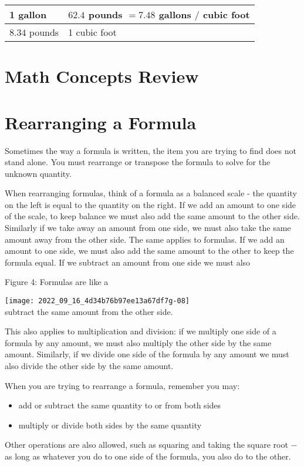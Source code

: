 \begin{enumerate}
\begin{tabular}{l|l}
1 gallon & $62.4$ pounds $=7.48$ gallons $/$ cubic foot \\
\hline
$8.34$ pounds & 1 cubic foot \\
\hline
\end{tabular}

\section{Math Concepts Review}
\section{Rearranging a Formula}
Sometimes the way a formula is written, the item you are trying to find does not stand alone. You must rearrange or transpose the formula to solve for the unknown quantity.

When rearranging formulas, think of a formula as a balanced scale - the quantity on the left is equal to the quantity on the right. If we add an amount to one side of the scale, to keep balance we must also add the same amount to the other side. Similarly if we take away an amount from one side, we must also take the same amount away from the other side. The same applies to formulas. If we add an amount to one side, we must also add the same amount to the other to keep the formula equal. If we subtract an amount from one side we must also

Figure 4: Formulas are like a

\texttt{[image: 2022\_09\_16\_4d34b76b97ee13a67df7g-08]}\\
subtract the same amount from the other side.

This also applies to multiplication and division: if we multiply one side of a formula by any amount, we must also multiply the other side by the same amount. Similarly, if we divide one side of the formula by any amount we must also divide the other side by the same amount.

When you are trying to rearrange a formula, remember you may:

\begin{itemize}
  \item add or subtract the same quantity to or from both sides

  \item multiply or divide both sides by the same quantity

\end{itemize}
Other operations are also allowed, such as squaring and taking the square root $-$ as long as whatever you do to one side of the formula, you also do to the other.


\end{enumerate}
